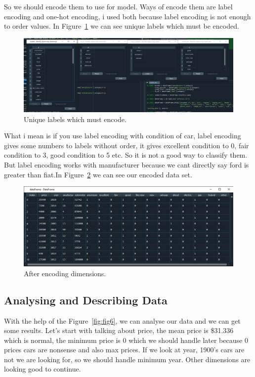 \documentclass[onecolumn]{article}
\begin{document}
So we should encode them to use for model. Ways of encode them are label encoding and one-hot encoding, i used both because label encoding is not enough to order values. In Figure~\ref{fig:fig3} we can see unique labels which must be encoded.


\begin{figure}[H]
\centering
    \includegraphics[width=.7\linewidth]{figures/Figure3.jpg}
\caption{\label{fig:fig3}
Unique labels which must encode.}
\end{figure}

What i mean is if you use label encoding with condition of car, label encoding gives some numbers to labels without order, it gives excellent condition to 0, fair condition to 3, good condition to 5 etc. So it is not a good way to classify them. But label encoding works with manufacturer because we cant directly say ford is greater than fiat.In Figure~\ref{fig:fig5} we can see our encoded data set.

\begin{figure}[H]
\centering
    \includegraphics[width=.7\linewidth]{figures/Figure5.png}
\caption{\label{fig:fig5}
After encoding dimensions.}
\end{figure}

\subsection{Analysing and Describing Data}
With the help of the Figure~\ref{fig:fig6}, we can analyse our data and we can get some results. Let's start with talking about price, the mean price is \$31.336 which is normal, the minimum price is 0 which we should handle later because 0 prices cars are nonsense and also max prices. If we look at year, 1900's cars are not we are looking for, so we should handle minimum year. Other dimensions are looking good to continue.
\end{document}

